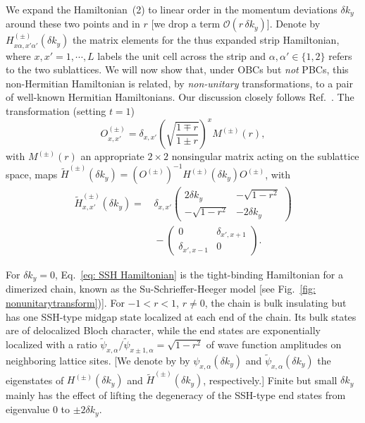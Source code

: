 We expand the Hamiltonian~(2) to linear order in the momentum deviations $\delta k_y$ around these two points and in $r$ [\ie we drop a term $\mathcal{O}(r\,\delta k_y)$]. 
Denote by 
$H^{(\pm)}_{x\alpha,x'\alpha'}(\delta k_y)$ the matrix elements for the thus expanded strip Hamiltonian,
where $x,x'=1,\cdots, L$ labels the unit cell across the strip and $\alpha,\alpha'\in\{1,2\}$ refers to the two sublattices. 
We will now show that, under OBCs but \emph{not} PBCs, this non-Hermitian Hamiltonian is related, by \emph{non-unitary} transformations, to a pair of well-known Hermitian Hamiltonians. Our discussion closely follows Ref.~\cite{Shunyu2018prl}. The transformation (setting $t=1$)
\begin{equation}
O_{x,x'}^{(\pm)}=\delta_{x,x'}\left(\sqrt{\frac{1\mp r}{1\pm r}}\right)^x M^{(\pm)}(r),
\end{equation}
with $M^{(\pm)}(r)$ an appropriate $2\times2 $ nonsingular matrix acting on the sublattice space,
maps  $\tilde{H}^{(\pm)}(\delta k_y)=\left(O^{(\pm)}\right)^{-1}H^{(\pm)}(\delta k_y)O^{(\pm)}$, with
\begin{equation}
\begin{split}
\tilde{H}^{(\pm)}_{x,x'}(\delta k_y)
=&\,
\delta_{x,x'}
\begin{pmatrix}
2\delta k_y&-\sqrt{1-r^2}\\
-\sqrt{1-r^2}&-2\delta k_y
\end{pmatrix}
\\
&\,
-
\begin{pmatrix}
0&\delta_{x',x+1}\\
\delta_{x',x-1}&0
\end{pmatrix}.
\end{split}
\label{eq: SSH Hamiltonian}
\end{equation}

For $\delta k_y=0$, Eq.~\eqref{eq: SSH Hamiltonian} is the tight-binding Hamiltonian for a dimerized chain, known as the Su-Schrieffer-Heeger model  [see Fig.~\ref{fig: nonunitarytransform})]. For $-1<r<1$, $r\neq0$, the chain is bulk insulating but has one SSH-type midgap state localized at each end of the chain. Its bulk states are of delocalized Bloch character, while the end states are exponentially localized with a ratio $\tilde{\psi}_{x,\alpha}/\tilde{\psi}_{x\pm1,\alpha}=\sqrt{1-r^2}$ of wave function amplitudes on neighboring lattice sites. [We denote by by $\psi_{x,\alpha}(\delta k_y)$ and $\tilde{\psi}_{x,\alpha}(\delta{k_y})$ the eigenstates of $H^{(\pm)}(\delta k_y)$ and $\tilde{H}^{(\pm)}(\delta k_y)$, respectively.]
Finite but small $\delta k_y$ mainly has the effect of lifting the degeneracy of the SSH-type end states from eigenvalue 0 to $\pm 2\delta k_y$. 

